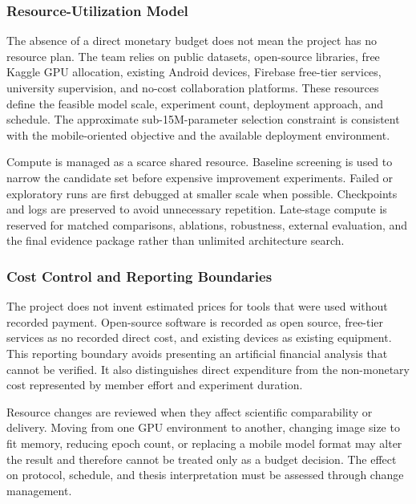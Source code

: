 \documentclass[12pt,a4paper]{report}
\begin{document}
\subsubsection{Resource-Utilization Model}
The absence of a direct monetary budget does not mean the project has no resource plan. The team relies on public datasets, open-source libraries, free Kaggle GPU allocation, existing Android devices, Firebase free-tier services, university supervision, and no-cost collaboration platforms. These resources define the feasible model scale, experiment count, deployment approach, and schedule. The approximate sub-15M-parameter selection constraint is consistent with the mobile-oriented objective and the available deployment environment.\par
Compute is managed as a scarce shared resource. Baseline screening is used to narrow the candidate set before expensive improvement experiments. Failed or exploratory runs are first debugged at smaller scale when possible. Checkpoints and logs are preserved to avoid unnecessary repetition. Late-stage compute is reserved for matched comparisons, ablations, robustness, external evaluation, and the final evidence package rather than unlimited architecture search.\par
\subsubsection{Cost Control and Reporting Boundaries}
The project does not invent estimated prices for tools that were used without recorded payment. Open-source software is recorded as open source, free-tier services as no recorded direct cost, and existing devices as existing equipment. This reporting boundary avoids presenting an artificial financial analysis that cannot be verified. It also distinguishes direct expenditure from the non-monetary cost represented by member effort and experiment duration.\par
Resource changes are reviewed when they affect scientific comparability or delivery. Moving from one GPU environment to another, changing image size to fit memory, reducing epoch count, or replacing a mobile model format may alter the result and therefore cannot be treated only as a budget decision. The effect on protocol, schedule, and thesis interpretation must be assessed through change management.\par
\end{document}

